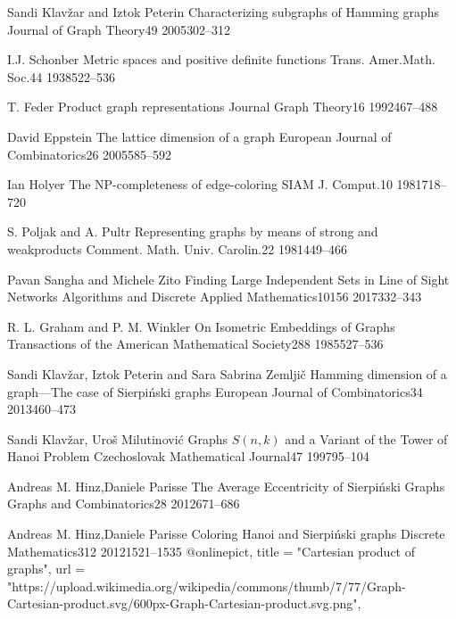 \documentclass[12pt,a4paper,titlepage,openany]{report}
\begin{document}
\begin{thebibliography}{99}
  \articleInJournalManyAuthors
    {Sandi Klav\v zar and Iztok Peterin}
    {Characterizing subgraphs of Hamming graphs}
   {Journal of Graph Theory}{49}
   {2005}{302--312}   

\articleInJournalOneAuthor
    {I.J. Schonber}
    {Metric spaces and positive definite functions}
   {Trans. Amer.Math. Soc.}{44}
   {1938}{522--536}

\articleInJournalOneAuthor
    {T. Feder}
    {Product graph representations}
   {Journal Graph Theory}{16}
   {1992}{467--488}
   
\articleInJournalOneAuthor
    {David Eppstein}
    {The lattice dimension of a graph}
   {European Journal of Combinatorics}{26}
   {2005}{585--592} 
   
\articleInJournalOneAuthor
    {Ian Holyer}
    {The NP-completeness of edge-coloring}
   {SIAM J. Comput.}{10}
   {1981}{718--720}    

  \articleInJournalManyAuthors
    {S. Poljak and A. Pultr}
    {Representing graphs by means of strong and weakproducts}
   {Comment. Math. Univ. Carolin.}{22}
   {1981}{449--466}  
   
  \articleInJournalManyAuthors
    {Pavan Sangha and Michele Zito}
    {Finding Large Independent Sets in Line of Sight Networks}
   {Algorithms and Discrete Applied Mathematics}{10156}
   {2017}{332--343}    
   
  \articleInJournalManyAuthors
    {R. L. Graham and P. M. Winkler}
    {On Isometric Embeddings of Graphs}
   {Transactions of the American Mathematical Society}{288}
   {1985}{527--536}    

  \articleInJournalManyAuthors
    {Sandi Klav\v zar, Iztok Peterin and Sara Sabrina Zemlji\v c}
    {Hamming dimension of a graph—The case of Sierpi\'nski graphs}
   {European Journal of Combinatorics}{34}
   {2013}{460--473}

  \articleInJournalManyAuthors
    {Sandi Klav\v zar, Uro\v s Milutinovi\' c}
    {Graphs $S(n, k)$ and a Variant of the Tower of Hanoi Problem}
   {Czechoslovak Mathematical Journal}{47}
   {1997}{95--104}

  \articleInJournalManyAuthors
    {Andreas M. Hinz,Daniele Parisse}
    {The Average Eccentricity of Sierpiński Graphs}
   {Graphs and Combinatorics}{28}
   {2012}{671--686}
   
  \articleInJournalManyAuthors
    {Andreas M. Hinz,Daniele Parisse}
    {Coloring Hanoi and Sierpiński graphs}
   {Discrete Mathematics}{312}
   {2012}{1521--1535}   
\newline
{}
@online{pict,
 title   = "Cartesian product of graphs",
 url     = "https://upload.wikimedia.org/wikipedia/commons/thumb/7/77/Graph-Cartesian-product.svg/600px-Graph-Cartesian-product.svg.png",
}

\end{thebibliography}
\newpage
\end{document}
